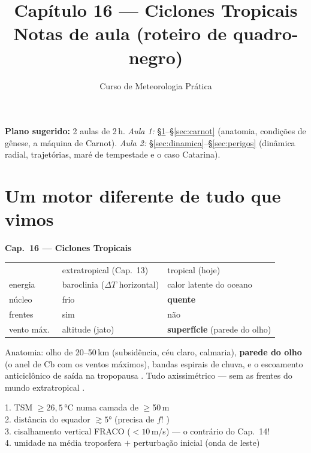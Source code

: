 \documentclass[11pt]{article}
\title{Capítulo 16 --- Ciclones Tropicais\\
{\large Notas de aula (roteiro de quadro-negro)}}
\author{Curso de Meteorologia Prática}
\date{}
\begin{document}
\maketitle
\thispagestyle{fancy}

\noindent\textbf{Plano sugerido:} 2 aulas de 2\,h.
\emph{Aula 1:} \S\ref{sec:anatomia}--\S\ref{sec:carnot} (anatomia,
condições de gênese, a máquina de Carnot).
\emph{Aula 2:} \S\ref{sec:dinamica}--\S\ref{sec:perigos} (dinâmica
radial, trajetórias, maré de tempestade e o caso Catarina).

\section{Um motor diferente de tudo que vimos}\label{sec:anatomia}

\begin{noquadro}
\textbf{Cap.~16 --- Ciclones Tropicais}\\[2pt]
\begin{tabular}{lll}
 & extratropical (Cap.~13) & tropical (hoje)\\
energia & baroclinia ($\Delta T$ horizontal) & calor latente do
oceano\\
núcleo & frio & \textbf{quente}\\
frentes & sim & não\\
vento máx.\ & altitude (jato) & \textbf{superfície} (parede do olho)\\
\end{tabular}
\end{noquadro}

Anatomia: olho de 20--50\,km (subsidência, céu claro, calmaria),
\textbf{parede do olho} (o anel de Cb com os ventos máximos), bandas
espirais de chuva, e o escoamento anticiclônico de saída na tropopausa
. Tudo axissimétrico — sem as frentes do mundo
extratropical .

\begin{noquadro}
1. TSM $\ge 26{,}5\,°$C numa camada de $\ge$50\,m\\
2. distância do equador $\gtrsim 5°$ (precisa de $f$!
)\\
3. cisalhamento vertical FRACO ($< 10$\,m/s) — o contrário do Cap.~14!\\
4. umidade na média troposfera $+$ perturbação inicial (onda de leste)
\end{noquadro}
\end{document}
